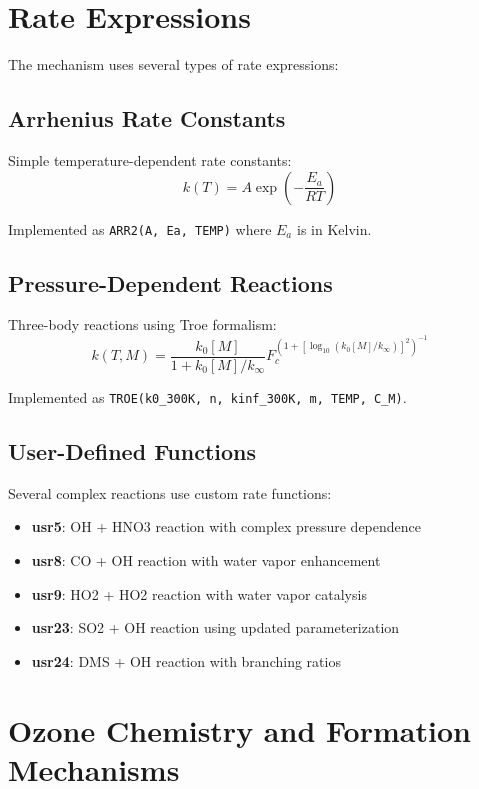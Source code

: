 \documentclass[12pt,a4paper]{article}
\begin{document}
\section{Rate Expressions}

The mechanism uses several types of rate expressions:

\subsection{Arrhenius Rate Constants}
Simple temperature-dependent rate constants:
\begin{equation}
k(T) = A \exp\left(-\frac{E_a}{RT}\right)
\end{equation}

Implemented as \texttt{ARR2(A, Ea, TEMP)} where $E_a$ is in Kelvin.

\subsection{Pressure-Dependent Reactions}
Three-body reactions using Troe formalism:
\begin{equation}
k(T,M) = \frac{k_0[M]}{1 + k_0[M]/k_\infty} F_c^{\left(1 + [\log_{10}(k_0[M]/k_\infty)]^2\right)^{-1}}
\end{equation}

Implemented as \texttt{TROE(k0\_300K, n, kinf\_300K, m, TEMP, C\_M)}.

\subsection{User-Defined Functions}
Several complex reactions use custom rate functions:

\begin{itemize}
    \item \textbf{usr5}: OH + HNO3 reaction with complex pressure dependence
    \item \textbf{usr8}: CO + OH reaction with water vapor enhancement
    \item \textbf{usr9}: HO2 + HO2 reaction with water vapor catalysis
    \item \textbf{usr23}: SO2 + OH reaction using updated parameterization
    \item \textbf{usr24}: DMS + OH reaction with branching ratios
\end{itemize}

\section{Ozone Chemistry and Formation Mechanisms}
\end{document}
